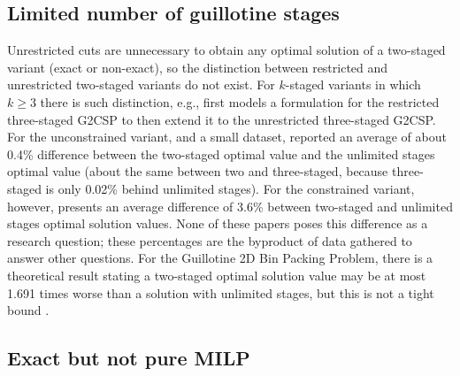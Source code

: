 \documentclass[ppgc,tese,english,formais,babel]{iiufrgs}
\begin{document}
\subsection{Limited number of guillotine stages}

Unrestricted cuts are unnecessary to obtain any optimal solution of a two-staged variant (exact or non-exact), so the distinction between restricted and unrestricted two-staged variants do not exist.
For \(k\)-staged variants in which~\(k \geq 3\) there is such distinction, e.g., \citet{puchinger:2007} first models a formulation for the restricted three-staged G2CSP to then extend it to the unrestricted three-staged G2CSP.
For the unconstrained variant, and a small dataset, \citet{beasley:1985:guillotine} reported an average of about 0.4\% difference between the two-staged optimal value and the unlimited stages optimal value (about the same between two and three-staged, because three-staged is only 0.02\% behind unlimited stages).
For the constrained variant, however, \citet{martin:2020:models} presents an average difference of 3.6\% between two-staged and unlimited stages optimal solution values.
None of these papers poses this difference as a research question; these percentages are the byproduct of data gathered to answer other questions.
For the Guillotine 2D Bin Packing Problem, there is a theoretical result stating a two-staged optimal solution value may be at most 1.691 times worse than a solution with unlimited stages, but this is not a tight bound \citep{bansal:2005}.

\subsection{Exact but not pure MILP}
\end{document}

